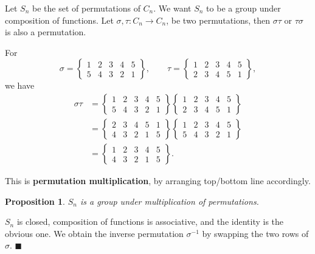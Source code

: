 \documentclass[letter-paper]{tufte-book}
\newtheorem{proposition}[theorem]{\color{pastel-blue}Proposition}
\newenvironment{proof}[1][Proof]{\begin{trivlist}
\item[\hskip \labelsep {\bfseries #1}]}{\end{trivlist}}
\newenvironment{example}[1][Example]{\begin{trivlist}
\item[\hskip \labelsep {\bfseries #1}]}{\end{trivlist}}
\newcommand\Def[1]{\textbf{#1}}
\newcommand{\qed}{\hfill$\blacksquare$}
\begin{document}
Let $S_n$ be the set of permutations of $C_n$. We want $S_n$ to be a group
under composition of functions. Let $\sigma,\tau:C_n\rightarrow C_n$, be
two permutations, then $\sigma\tau$ or $\tau\sigma$ is also a permutation.
\begin{example}
  For
  \begin{equation*}
    \sigma=\left\{\begin{matrix}1 & 2 & 3 & 4 & 5\\
    5 & 4 & 3 & 2 & 1\end{matrix}\right\},\qquad
    \tau=\left\{\begin{matrix}1 & 2 & 3 & 4 & 5\\
    2 & 3 & 4 & 5 & 1\end{matrix}\right\},
  \end{equation*}
  we have
  \begin{align*}
    \sigma\tau &=\left\{\begin{matrix}1 & 2 & 3 & 4 & 5\\
    5 & 4 & 3 & 2 & 1\end{matrix}\right\}
    \left\{\begin{matrix}1 & 2 & 3 & 4 & 5\\
    2 & 3 & 4 & 5 & 1\end{matrix}\right\}\\
    &=\left\{\begin{matrix}2 & 3 & 4 & 5 & 1\\
    4 & 3 & 2 & 1 & 5\end{matrix}\right\}
    \left\{\begin{matrix}1 & 2 & 3 & 4 & 5\\
    5 & 4 & 3 & 2 & 1\end{matrix}\right\}\\
    &=\left\{\begin{matrix}1 & 2 & 3 & 4 & 5\\
    4 & 3 & 2 & 1 & 5\end{matrix}\right\}.
  \end{align*}
\end{example}
This is \Def{permutation multiplication}, by arranging top/bottom
line accordingly.
\begin{proposition}
  $S_n$ is a group under multiplication of permutations.
\end{proposition}
\begin{proof}
  $S_n$ is closed, composition of functions is associative, and the identity is
  the obvious one. We obtain the inverse permutation $\sigma^{-1}$ by swapping
  the two rows of $\sigma$. \qed
\end{proof}
\end{document}
